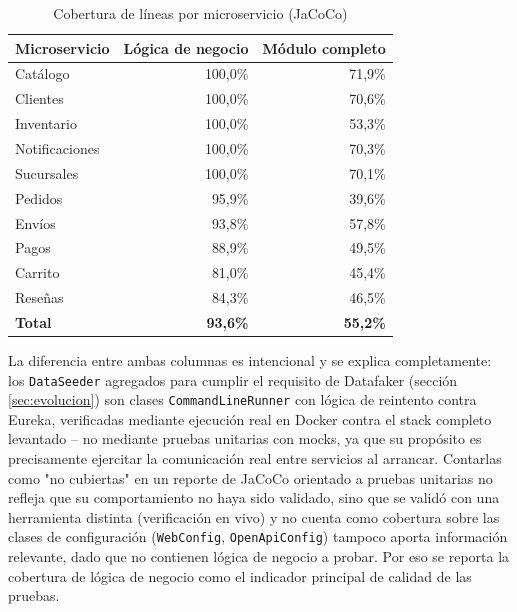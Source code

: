 \begin{table}[h]
\centering
\begin{tabular}{lrr}
\toprule
\textbf{Microservicio} & \textbf{Lógica de negocio} & \textbf{Módulo completo} \\
\midrule
Catálogo & 100,0\% & 71,9\% \\
Clientes & 100,0\% & 70,6\% \\
Inventario & 100,0\% & 53,3\% \\
Notificaciones & 100,0\% & 70,3\% \\
Sucursales & 100,0\% & 70,1\% \\
Pedidos & 95,9\% & 39,6\% \\
Envíos & 93,8\% & 57,8\% \\
Pagos & 88,9\% & 49,5\% \\
Carrito & 81,0\% & 45,4\% \\
Reseñas & 84,3\% & 46,5\% \\
\midrule
\textbf{Total} & \textbf{93,6\%} & \textbf{55,2\%} \\
\bottomrule
\end{tabular}
\caption{Cobertura de líneas por microservicio (JaCoCo)}
\label{tab:cobertura}
\end{table}

La diferencia entre ambas columnas es intencional y se explica completamente: los
\texttt{DataSeeder} agregados para cumplir el requisito de Datafaker (sección
\ref{sec:evolucion}) son clases \texttt{CommandLineRunner} con lógica de reintento
contra Eureka, verificadas mediante ejecución real en Docker contra el stack completo
levantado -- no mediante pruebas unitarias con mocks, ya que su propósito es
precisamente ejercitar la comunicación real entre servicios al arrancar. Contarlas
como "no cubiertas" en un reporte de JaCoCo orientado a pruebas unitarias no refleja
que su comportamiento no haya sido validado, sino que se validó con una herramienta
distinta (verificación en vivo) y no cuenta como cobertura sobre las clases de
configuración (\texttt{WebConfig}, \texttt{OpenApiConfig}) tampoco aporta información
relevante, dado que no contienen lógica de negocio a probar. Por eso se reporta la
cobertura de lógica de negocio como el indicador principal de calidad de las pruebas.
